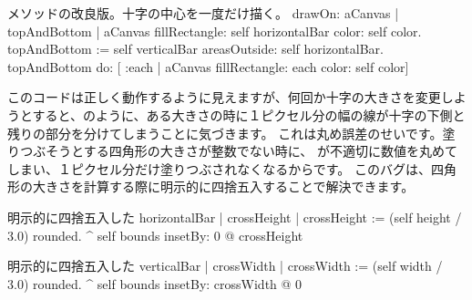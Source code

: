 \documentclass[a4paper,10pt,twoside]{book}
\begin{document}
\begin{method}{メソッドの改良版。十字の中心を一度だけ描く。}
drawOn: aCanvas 
	| topAndBottom |
	aCanvas fillRectangle: self horizontalBar color: self color.
	topAndBottom := self verticalBar areasOutside: self horizontalBar. 
	topAndBottom do: [ :each | aCanvas fillRectangle: each color: self color]
\end{method}

このコードは正しく動作するように見えますが、何回か十字の大きさを変更しようとすると、のように、ある大きさの時に１ピクセル分の幅の線が十字の下側と残りの部分を分けてしまうことに気づきます。
これは丸め誤差のせいです。塗りつぶそうとする四角形の大きさが整数でない時に、
が不適切に数値を丸めてしまい、１ピクセル分だけ塗りつぶされなくなるからです。
このバグは、四角形の大きさを計算する際に明示的に四捨五入することで解決できます。

\begin{method}{明示的に四捨五入した}
horizontalBar
	| crossHeight |
	crossHeight := (self height / 3.0) rounded.
	^ self bounds insetBy: 0 @ crossHeight
\end{method}

\begin{method}{明示的に四捨五入した}
verticalBar
	| crossWidth |
	crossWidth := (self width / 3.0) rounded.
	^ self bounds insetBy: crossWidth @ 0
\end{method}






\end{document}
